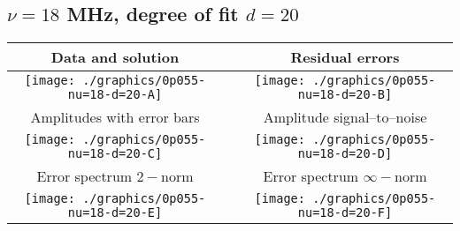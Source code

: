 

% 

\clearpage{}
\break{}

\subsection{$\nu = 18$ MHz, degree of fit $d = 20$}

\begin{table}[h]
    \begin{center}
        \begin{tabular}{ccc}
            Data and solution & \quad & Residual errors \\\hline
            \texttt{[image: ./graphics/0p055-nu=18-d=20-A]} &&
            \texttt{[image: ./graphics/0p055-nu=18-d=20-B]} \\[15pt]
            Amplitudes with error bars && Amplitude signal--to--noise \\\hline
            \texttt{[image: ./graphics/0p055-nu=18-d=20-C]} &&
            \texttt{[image: ./graphics/0p055-nu=18-d=20-D]} \\[15pt]
            Error spectrum $2-$norm && Error spectrum $\infty-$norm \\\hline
            \texttt{[image: ./graphics/0p055-nu=18-d=20-E]} &&
            \texttt{[image: ./graphics/0p055-nu=18-d=20-F]} \\[15pt]
        \end{tabular}
    \end{center}
\label{fig:elev=55, nu=18}
\end{table}



\endinput
